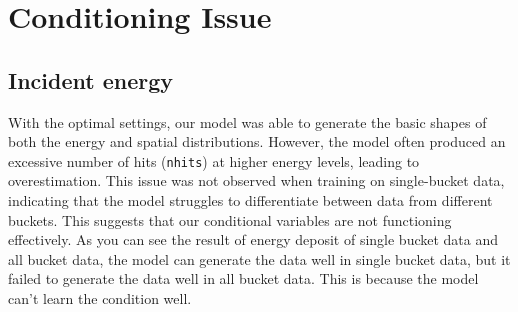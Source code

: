\section{Conditioning Issue}
\subsection{Incident energy}
With the optimal settings, our model was able to generate the basic shapes of both the energy and spatial distributions. However, the model often produced an excessive number of hits (\texttt{nhits}) at higher energy levels, leading to overestimation. This issue was not observed when training on single-bucket data, indicating that the model struggles to differentiate between data from different buckets. This suggests that our conditional variables are not functioning effectively. As you can see the result of energy deposit of single bucket data and all bucket data, the model can generate the data well in single bucket data, but it failed to generate the data well in all bucket data. This is because the model can't learn the condition well.

